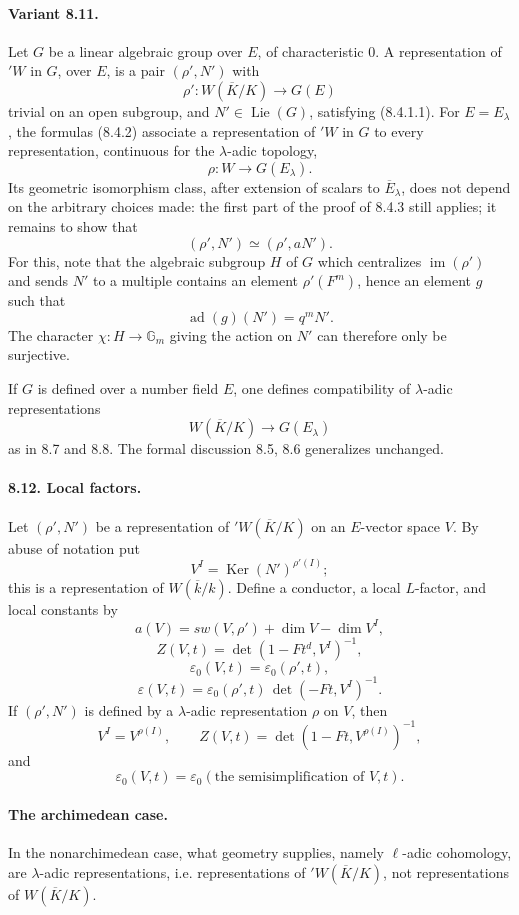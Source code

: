 \documentclass[10pt]{article}
\providecommand{\Ker}{\operatorname{Ker}}
\providecommand{\im}{\operatorname{im}}
\providecommand{\im}{\operatorname{im}}
\providecommand{\Lie}{\operatorname{Lie}}
\providecommand{\Lie}{\operatorname{Lie}}
\providecommand{\im}{\operatorname{im}}
\providecommand{\ad}{\operatorname{ad}}
\providecommand{\Ker}{\operatorname{Ker}}
\begin{document}
\paragraph{Variant 8.11.} Let $G$ be a linear algebraic group over $E$, of characteristic $0$. A representation of ${}'W$ in $G$, over $E$, is a pair $(\rho',N')$ with
\[
\rho':W(\overline K/K)\longrightarrow G(E)
\]
trivial on an open subgroup, and $N'\in\Lie(G)$, satisfying (8.4.1.1). For $E=E_\lambda$, the formulas (8.4.2) associate a representation of ${}'W$ in $G$ to every representation, continuous for the $\lambda$-adic topology,
\[
\rho:W\longrightarrow G(E_\lambda).
\]
Its geometric isomorphism class, after extension of scalars to $\overline E_\lambda$, does not depend on the arbitrary choices made: the first part of the proof of 8.4.3 still applies; it remains to show that
\[
(\rho',N')\simeq(\rho',aN').
\]
For this, note that the algebraic subgroup $H$ of $G$ which centralizes $\im(\rho')$ and sends $N'$ to a multiple contains an element $\rho'(F^m)$, hence an element $g$ such that
\[
\ad(g)(N')=q^mN'.
\]
The character $\chi:H\to\mathbb G_m$ giving the action on $N'$ can therefore only be surjective.

If $G$ is defined over a number field $E$, one defines compatibility of $\lambda$-adic representations
\[
W(\overline K/K)\longrightarrow G(E_\lambda)
\]
as in 8.7 and 8.8. The formal discussion 8.5, 8.6 generalizes unchanged.

\paragraph{8.12. Local factors.} Let $(\rho',N')$ be a representation of ${}'W(\overline K/K)$ on an $E$-vector space $V$. By abuse of notation put
\[
V^I=\Ker(N')^{\rho'(I)};
\]
this is a representation of $W(\overline k/k)$. Define a conductor, a local $L$-factor, and local constants by
\[
\tag{8.12.1}
a(V)=sw(V,\rho')+\dim V-\dim V^I,
\]
\[
\tag{8.12.2}
Z(V,t)=\det(1-Ft^d,V^I)^{-1},
\]
\[
\tag{8.12.3}
\varepsilon_0(V,t)=\varepsilon_0(\rho',t),
\]
\[
\tag{8.12.4}
\varepsilon(V,t)=\varepsilon_0(\rho',t)\,\det(-Ft,V^I)^{-1}.
\]
If $(\rho',N')$ is defined by a $\lambda$-adic representation $\rho$ on $V$, then
\[
V^I=V^{\rho(I)},
\qquad
Z(V,t)=\det(1-Ft,V^{\rho(I)})^{-1},
\]
and
\[
\varepsilon_0(V,t)=\varepsilon_0(\text{the semisimplification of }V,t).
\]

\paragraph{The archimedean case.} In the nonarchimedean case, what geometry supplies, namely $\ell$-adic cohomology, are $\lambda$-adic representations, i.e. representations of ${}'W(\overline K/K)$, not representations of $W(\overline K/K)$.
\end{document}
